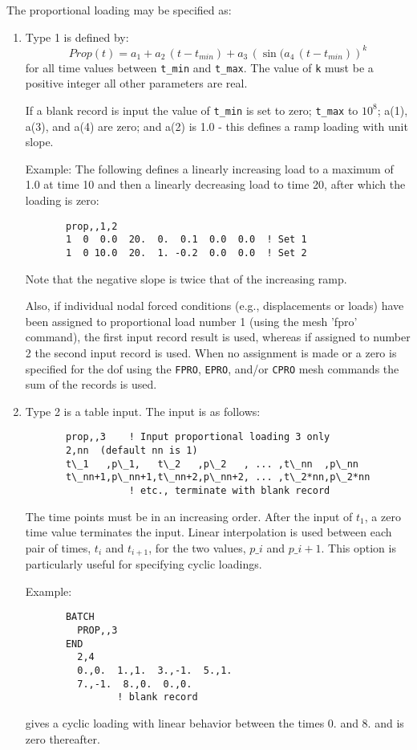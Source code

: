 The proportional loading may be specified as:
\begin{enumerate}
\item{
Type 1 is defined by:
\begin{equation}
Prop(t) = a_1 + a_2 \, (t - t_{min})
                 + a_3 \, \left(\sin( a_4 \, (t - t_{min}) \right)^{k}
\end{equation}
for all time values between {\tt t\_min} and {\tt t\_max}.  The value of
{\tt k} must be a positive integer all other parameters are real.

If a blank record is input the value of {\tt t\_min} is set to zero;
{\tt t\_max} to $10^8$; a(1), a(3), and a(4) are zero; and a(2) is
1.0 - this defines a ramp loading with unit slope.

Example: The following defines a linearly increasing
load to a maximum of 1.0 at time 10 and then a linearly
decreasing load to time 20, after which the loading is
zero:
\begin{verbatim}
       prop,,1,2
       1  0  0.0  20.  0.  0.1  0.0  0.0  ! Set 1
       1  0 10.0  20.  1. -0.2  0.0  0.0  ! Set 2
\end{verbatim}
Note that the negative slope is twice that of the increasing ramp.

Also, if individual nodal forced conditions (e.g.,
displacements or loads) have been assigned to proportional
load number 1 (using the mesh 'fpro' command),
the first input record result is used, whereas if
assigned to number 2 the second input record is used.
When no assignment is made or a zero is specified for
the dof using the {\tt FPRO}, {\tt EPRO}, and/or {\tt CPRO}
mesh commands the sum of the records is used.
}
\item{
Type 2 is a table input.  The input is as follows:
\begin{verbatim}
       prop,,3    ! Input proportional loading 3 only
       2,nn  (default nn is 1)
       t\_1   ,p\_1,   t\_2   ,p\_2   , ... ,t\_nn  ,p\_nn
       t\_nn+1,p\_nn+1,t\_nn+2,p\_nn+2, ... ,t\_2*nn,p\_2*nn
                  ! etc., terminate with blank record
\end{verbatim}
The time points must be in an increasing order.  After the
input of $t_1$, a zero time value terminates the input.
Linear interpolation is used between each pair of times, $t_i$
and $t_{i+1}$, for the two values, $p\_i$ and $p\_{i+1}$. This
option is particularly useful for specifying cyclic loadings.

Example:
\begin{verbatim}
       BATCH
         PROP,,3
       END
         2,4
         0.,0.  1.,1.  3.,-1.  5.,1.
         7.,-1.  8.,0.  0.,0.
                ! blank record
\end{verbatim}
gives a cyclic loading with linear behavior between the
times 0. and 8. and is zero thereafter.
}
\end{enumerate}
\vfill\eject
